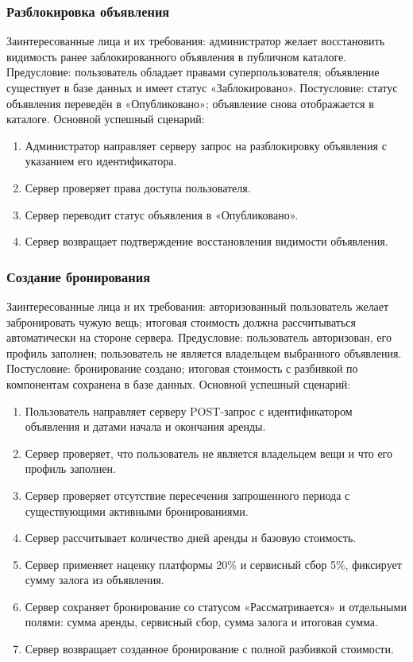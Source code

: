 \subsubsection{Разблокировка объявления}
Заинтересованные лица и их требования: администратор желает восстановить видимость ранее заблокированного объявления в публичном каталоге.
Предусловие: пользователь обладает правами суперпользователя; объявление существует в базе данных и имеет статус «Заблокировано».
Постусловие: статус объявления переведён в «Опубликовано»; объявление снова отображается в каталоге.
Основной успешный сценарий:
\begin{enumerate}
\item Администратор направляет серверу запрос на разблокировку объявления с указанием его идентификатора.
\item Сервер проверяет права доступа пользователя.
\item Сервер переводит статус объявления в «Опубликовано».
\item Сервер возвращает подтверждение восстановления видимости объявления.
\end{enumerate}

\subsubsection{Создание бронирования}
Заинтересованные лица и их требования: авторизованный пользователь желает забронировать чужую вещь; итоговая стоимость должна рассчитываться автоматически на стороне сервера.
Предусловие: пользователь авторизован, его профиль заполнен; пользователь не является владельцем выбранного объявления.
Постусловие: бронирование создано; итоговая стоимость с разбивкой по компонентам сохранена в базе данных.
Основной успешный сценарий:
\begin{enumerate}
\item Пользователь направляет серверу POST-запрос с идентификатором объявления и датами начала и окончания аренды.
\item Сервер проверяет, что пользователь не является владельцем вещи и что его профиль заполнен.
\item Сервер проверяет отсутствие пересечения запрошенного периода с существующими активными бронированиями.
\item Сервер рассчитывает количество дней аренды и базовую стоимость.
\item Сервер применяет наценку платформы 20\% и сервисный сбор 5\%, фиксирует сумму залога из объявления.
\item Сервер сохраняет бронирование со статусом «Рассматривается» и отдельными полями: сумма аренды, сервисный сбор, сумма залога и итоговая сумма.
\item Сервер возвращает созданное бронирование с полной разбивкой стоимости.
\end{enumerate}

